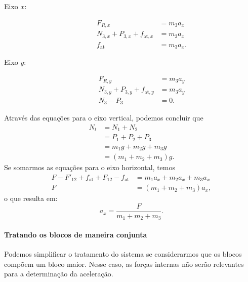 \begin{description}
        \begin{description}
            \item[Eixo $x$:]
                \begin{align}
                    F_{R, x} &= m_3 a_x \\
                    N_{3,x} + P_{3,x} + f_{\text{at},x} &= m_3 a_x \\
                    f_{\text{at}} &= m_3 a_x. \label{Eq:DiscForcasInternasBl2X}
                \end{align}
            \item[Eixo $y$:]
                \begin{align}
                    F_{R, y} &= m_3 a_y \\
                    N_{3,y} + P_{3,y} + f_{\text{at},y} &= m_3 a_y \\
                    N_3 - P_3 &= 0.
                \end{align}
        \end{description}
\end{description}

\noindent{}Através das equações para o eixo vertical, podemos concluir que
\begin{align}
    N_t &= N_1 + N_2 \\
    &= P_1 + P_2 + P_3\\
    &= m_1g + m_2g + m_3g\\
    &= (m_1 + m_2 + m_3)g.
\end{align}
%
Se somarmos as equações para o eixo horizontal, temos
\begin{align}
    F - F'_{12} + f_{\text{at}} + F_{12} - f_{\text{at}} &= m_1 a_x + m_2 a_x + m_3 a_x \\
    F &= (m_1 + m_2 + m_3) a_x,
\end{align}
%
o que resulta em:
\begin{equation}
    a_x = \frac{F}{m_1 + m_2 + m_3}.
\end{equation}

\paragraph{Tratando os blocos de maneira conjunta}

Podemos simplificar o tratamento do sistema se considerarmos que os blocos compõem um bloco maior. Nesse caso, as forças internas não serão relevantes para a determinação da aceleração.

